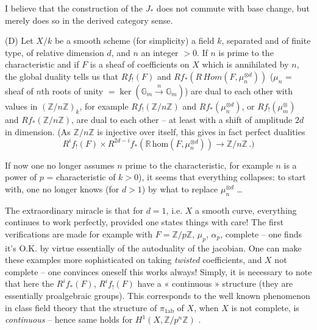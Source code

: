 \documentclass[11pt,a4paper]{article}
\begin{document}
I believe that the construction of the $J_*$ does not commute with base change, but merely does so in the derived category sense.

(D) Let $X/k$ be a smooth scheme (for simplicity)   a field $k$, separated and of finite type, of relative dimension $d$, and $n$ an integer $>0$. If $n$ is prime to the characteristic and if $F$ is a sheaf of coefficients on $X$ which is annihilated by $n$, the global duality tells us that $Rf_!(F)$ and $Rf_*(R\,\mathit{Hom}(F, \mu_n^{\otimes d}))$ ($\mu_n$ = sheaf of $n$th roots of unity $= \ker(\mathbb{G}_m \xrightarrow{n} \mathbb{G}_m)$) are dual to each other with values in $(\mathbb{Z}/n\mathbb{Z})_k$, for example $Rf_!(\mathbb{Z}/n\mathbb{Z})$ and $Rf_*(\mu_n^{\otimes d})$, or $Rf_!(\mu_m^{\otimes})$ and $Rf_*(\mathbb{Z}/n\mathbb{Z})$, are dual to each other -- at least with a shift of amplitude $2d$ in dimension. (As $\mathbb{Z}/n\mathbb{Z}$ is injective over itself, this gives in fact perfect dualities
\[
R^if_!(F) \times R^{2d-i}f_*(\mathbb{R}\,\mathrm{hom}(F, \mu_n^{\otimes d})) \longrightarrow \mathbb{Z}/n\mathbb{Z} \,.)
\]

If now one no longer assumes $n$ prime to the characteristic, for example $n$ is a power of $p$ = characteristic of $k > 0$), it seems that everything collapses: to start with, one no longer knows (for $d > 1$) by what to replace $\mu_n^{\otimes d}$ …

The extraordinary miracle is that for $d = 1$, i.e. $X$ a smooth curve, everything continues to work perfectly, provided one states things with care! The first verifications are made for example with $F = \mathbb{Z}/p\mathbb{Z}$, $\mu_p$,  $\alpha_p$,  complete -- one finds it's O.K. by virtue essentially of the autoduality of the jacobian. One can make these examples more sophisticated on taking \emph{twisted} coefficients, and $X$ not complete -- one convinces oneself this works always! Simply, it is necessary to note that here the $R^if_*(F)$, $R^if_!(F)$ have a « continuous » structure (they are essentially proalgebraic groups). This corresponds to the well known phenomenon in class field theory that the structure of $\pi_{1\mathrm{ab}}$ of $X$, when $X$ is not complete, is \emph{continuous} -- hence same holds for $H^1(X, \mathbb{Z}/p^n\mathbb{Z})$ .
\end{document}
